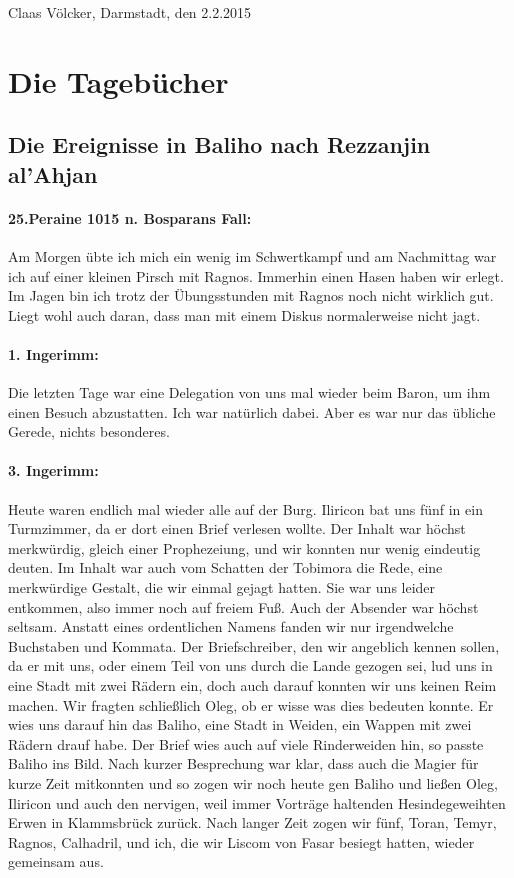 \begin{flushright}
Claas Völcker, Darmstadt, den 2.2.2015
\end{flushright}


\section{Die Tagebücher}


\subsection{Die Ereignisse in Baliho nach Rezzanjin al'Ahjan}

\paragraph{25.Peraine 1015 n. Bosparans Fall:} Am Morgen übte ich mich ein wenig im Schwertkampf und am Nachmittag war ich auf einer kleinen Pirsch mit Ragnos. Immerhin einen Hasen haben wir erlegt. Im Jagen bin ich trotz der Übungsstunden mit Ragnos noch nicht wirklich gut. Liegt wohl auch daran, dass man mit einem Diskus normalerweise nicht jagt.

\paragraph{1. Ingerimm:} Die letzten Tage war eine Delegation von uns mal wieder beim Baron, um ihm einen Besuch abzustatten. Ich war natürlich dabei. Aber es war nur das übliche Gerede, nichts besonderes.

\paragraph{3. Ingerimm:} Heute waren endlich mal wieder alle auf der Burg. Iliricon bat uns fünf in ein Turmzimmer, da er dort einen Brief verlesen wollte. Der Inhalt war höchst merkwürdig, gleich einer Prophezeiung, und wir konnten nur wenig eindeutig deuten. Im Inhalt war auch vom Schatten der Tobimora die Rede, eine merkwürdige Gestalt, die wir einmal gejagt hatten. Sie war uns leider entkommen, also immer noch auf freiem Fuß. Auch der Absender war höchst seltsam. Anstatt eines ordentlichen Namens fanden wir nur irgendwelche Buchstaben und Kommata. Der Briefschreiber, den wir angeblich kennen sollen, da er mit uns, oder einem Teil von uns durch die Lande gezogen sei, lud uns in eine Stadt mit zwei Rädern ein, doch auch darauf konnten wir uns keinen Reim machen. Wir fragten schließlich Oleg, ob er wisse was dies bedeuten konnte. Er wies uns darauf hin das Baliho, eine Stadt in Weiden, ein Wappen mit zwei Rädern drauf habe. Der Brief wies auch auf viele Rinderweiden hin, so passte Baliho ins Bild. Nach kurzer Besprechung war klar, dass auch die Magier für kurze Zeit mitkonnten und so zogen wir noch heute gen Baliho und ließen Oleg, Iliricon und auch den nervigen, weil immer Vorträge haltenden Hesindegeweihten Erwen in Klammsbrück zurück. Nach langer Zeit zogen wir fünf, Toran, Temyr, Ragnos, Calhadril, und ich, die wir Liscom von Fasar besiegt hatten, wieder gemeinsam aus.

